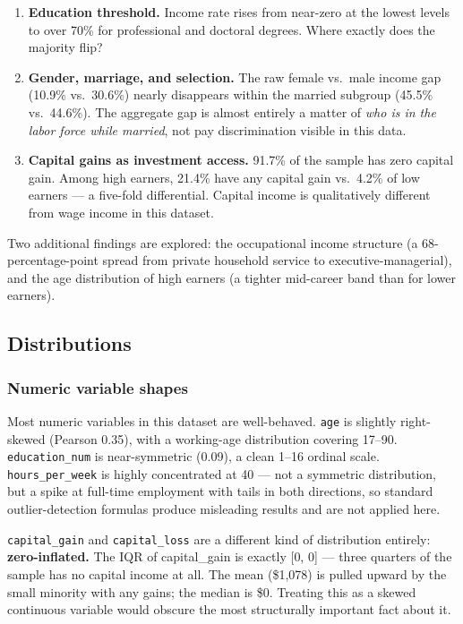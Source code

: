 \documentclass[
  letterpaper,
  DIV=11,
  numbers=noendperiod]{scrartcl}
\providecommand{\tightlist}{%
  \setlength{\itemsep}{0pt}\setlength{\parskip}{0pt}}\usepackage{longtable,booktabs,array}
\begin{document}
\begin{enumerate}
\def\labelenumi{\arabic{enumi}.}
\tightlist
\item
  \textbf{Education threshold.} Income rate rises from near-zero at the
  lowest levels to over 70\% for professional and doctoral degrees.
  Where exactly does the majority flip?
\item
  \textbf{Gender, marriage, and selection.} The raw female vs.~male
  income gap (10.9\% vs.~30.6\%) nearly disappears within the married
  subgroup (45.5\% vs.~44.6\%). The aggregate gap is almost entirely a
  matter of \emph{who is in the labor force while married}, not pay
  discrimination visible in this data.
\item
  \textbf{Capital gains as investment access.} 91.7\% of the sample has
  zero capital gain. Among high earners, 21.4\% have any capital gain
  vs.~4.2\% of low earners --- a five-fold differential. Capital income
  is qualitatively different from wage income in this dataset.
\end{enumerate}

Two additional findings are explored: the occupational income structure
(a 68-percentage-point spread from private household service to
executive-managerial), and the age distribution of high earners (a
tighter mid-career band than for lower earners).

\subsection{Distributions}\label{distributions}

\subsubsection{Numeric variable shapes}\label{numeric-variable-shapes}

Most numeric variables in this dataset are well-behaved. \texttt{age} is
slightly right-skewed (Pearson 0.35), with a working-age distribution
covering 17--90. \texttt{education\_num} is near-symmetric (0.09), a
clean 1--16 ordinal scale. \texttt{hours\_per\_week} is highly
concentrated at 40 --- not a symmetric distribution, but a spike at
full-time employment with tails in both directions, so standard
outlier-detection formulas produce misleading results and are not
applied here.

\texttt{capital\_gain} and \texttt{capital\_loss} are a different kind
of distribution entirely: \textbf{zero-inflated.} The IQR of
capital\_gain is exactly {[}0, 0{]} --- three quarters of the sample has
no capital income at all. The mean (\$1,078) is pulled upward by the
small minority with any gains; the median is \$0. Treating this as a
skewed continuous variable would obscure the most structurally important
fact about it.
\end{document}
